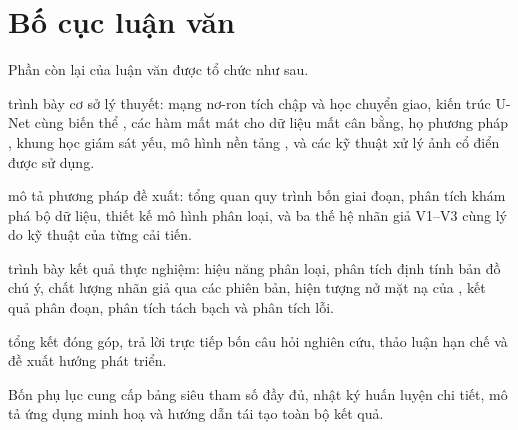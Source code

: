 \section{Bố cục luận văn}
\label{sec:bocuc}

Phần còn lại của luận văn được tổ chức như sau.

\textbf{} trình bày cơ sở lý thuyết: mạng nơ-ron tích
chập và học chuyển giao, kiến trúc U-Net cùng biến thể \UNetpp{}, các hàm mất mát
cho dữ liệu mất cân bằng, họ phương pháp \GradCAM{}, khung học giám sát yếu, mô
hình nền tảng \SAM{}, và các kỹ thuật xử lý ảnh cổ điển được sử dụng.

\textbf{} mô tả phương pháp đề xuất: tổng quan quy trình
bốn giai đoạn, phân tích khám phá bộ dữ liệu, thiết kế mô hình phân loại, và ba
thế hệ nhãn giả V1--V3 cùng lý do kỹ thuật của từng cải tiến.

\textbf{} trình bày kết quả thực nghiệm: hiệu năng phân
loại, phân tích định tính bản đồ chú ý, chất lượng nhãn giả qua các phiên bản,
hiện tượng nở mặt nạ của \SAM{}, kết quả phân đoạn, phân tích tách bạch và phân
tích lỗi.

\textbf{} tổng kết đóng góp, trả lời trực tiếp bốn câu hỏi
nghiên cứu, thảo luận hạn chế và đề xuất hướng phát triển.

Bốn phụ lục cung cấp bảng siêu tham số đầy đủ, nhật ký huấn luyện chi tiết, mô tả
ứng dụng minh hoạ và hướng dẫn tái tạo toàn bộ kết quả.
